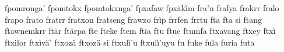 fpomronga'\hspace{2mm}
fpomtokx\hspace{2mm}
fpomtokxnga'\hspace{2mm}
fpxafaw\hspace{2mm}
fpxäkìm\hspace{2mm}
fra'u\hspace{2mm}
frafya\hspace{2mm}
frakrr\hspace{2mm}
fralo\hspace{2mm}
frapo\hspace{2mm}
frato\hspace{2mm}
fratrr\hspace{2mm}
fratxon\hspace{2mm}
fratseng\hspace{2mm}
frawzo\hspace{2mm}
frìp\hspace{2mm}
frrfen\hspace{2mm}
frrtu\hspace{2mm}
fta\hspace{2mm}
fta si\hspace{2mm}
ftang\hspace{2mm}
ftawnemkrr\hspace{2mm}
ftär\hspace{2mm}
ftärpa\hspace{2mm}
fte\hspace{2mm}
fteke\hspace{2mm}
ftem\hspace{2mm}
ftia\hspace{2mm}
ftu\hspace{2mm}
ftue\hspace{2mm}
ftumfa\hspace{2mm}
ftxavang\hspace{2mm}
ftxey\hspace{2mm}
ftxì\hspace{2mm}
ftxìlor\hspace{2mm}
ftxìvä'\hspace{2mm}
ftxozä\hspace{2mm}
ftxozä si\hspace{2mm}
ftxulì'u\hspace{2mm}
ftxulì'uyu\hspace{2mm}
fu\hspace{2mm}
fuke\hspace{2mm}
fula\hspace{2mm}
furia\hspace{2mm}
futa\hspace{2mm}
